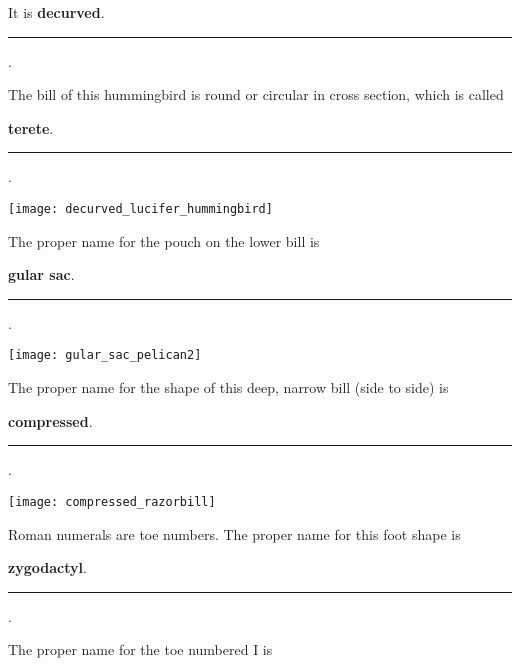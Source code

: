 \documentclass[12pt, addpoints]{exam}
\begin{document}
\begin{questions}
\begin{multicols}{2}

\bigskip

It is \ifprintanswers \textbf{decurved}. \else \rule{2.5in}{0.4pt}.\fi

\bigskip

\question
The bill of this hummingbird is round or circular in cross section, which is called

\bigskip

\ifprintanswers \textbf{terete}. \else \rule{2.5in}{0.4pt}.\fi


\columnbreak
\texttt{[image: decurved\_lucifer\_hummingbird]}
\end{multicols}

\vspace{\baselineskip}

\begin{multicols}{2} \raggedcolumns
	\question
	The proper name for the pouch on the lower bill is
	
	
	\bigskip
	
	\ifprintanswers \textbf{gular sac}. \else \rule{2.5in}{0.4pt}. \fi
	
	\columnbreak
	\texttt{[image: gular\_sac\_pelican2]}
\end{multicols}

\newpage

\begin{multicols}{2} \raggedcolumns
	\question
	The proper name for the shape of this
	deep, narrow bill (side to side) is 
	
	\bigskip
	
	\ifprintanswers \textbf{compressed}. \else \rule{2.5in}{0.4pt}. \fi
	
	\columnbreak
	\texttt{[image: compressed\_razorbill]}
\end{multicols}

\begin{multicols}{2} \raggedcolumns
	\question
	 Roman numerals are toe numbers. The proper name for this foot shape is
	
	\bigskip
	
	\ifprintanswers \textbf{zygodactyl}. \else \rule{2.5in}{0.4pt}. \fi
	
	\smallskip
	
	

	\bigskip \bigskip
	
	\question
	The proper name for the toe numbered I is
	

\end{multicols}
\end{questions}
\end{document}
